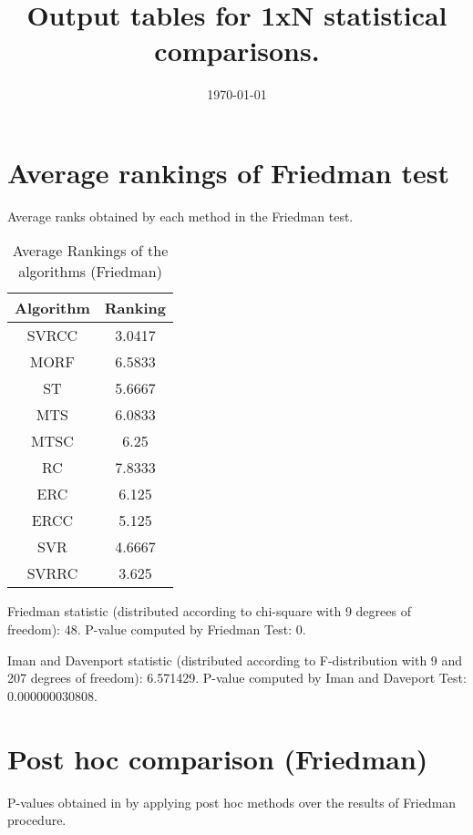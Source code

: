\documentclass[a4paper,10pt]{article}
\title{Output tables for 1xN statistical comparisons.}
\author{}
\date{\today}
\begin{document}
\begin{landscape}
\pagestyle{empty}
\maketitle
\thispagestyle{empty}

\section{Average rankings of Friedman test}


Average ranks obtained by each method in the Friedman test.

\begin{table}[!htp]
\centering
\begin{tabular}{|c|c|}\hline
Algorithm&Ranking\\\hline
SVRCC&3.0417\\MORF&6.5833\\ST&5.6667\\MTS&6.0833\\MTSC&6.25\\RC&7.8333\\ERC&6.125\\ERCC&5.125\\SVR&4.6667\\SVRRC&3.625\\\hline\end{tabular}
\caption{Average Rankings of the algorithms (Friedman)}
\end{table}

Friedman statistic (distributed according to chi-square with 9 degrees of freedom): 48. \newline P-value computed by Friedman Test: 0.\newline

Iman and Davenport statistic (distributed according to F-distribution with 9 and 207 degrees of freedom): 6.571429. \newline P-value computed by Iman and Daveport Test: 0.000000030808.\newline


\newpage

\section{Post hoc comparison (Friedman)}


P-values obtained in by applying post hoc methods over the results of Friedman procedure.


\end{landscape}
\end{document}
